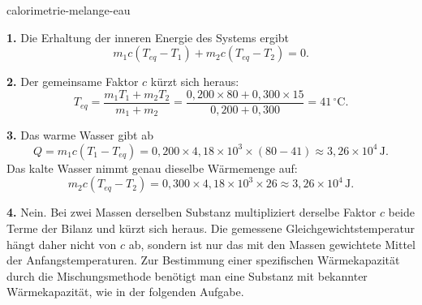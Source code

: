 \begin{exo}{calorimetrie-melange-eau}
\begin{solution}
\textbf{1.} Die Erhaltung der inneren Energie des Systems ergibt
\[
m_1c(T_{eq}-T_1)+m_2c(T_{eq}-T_2)=0.
\]

\textbf{2.} Der gemeinsame Faktor $c$ kürzt sich heraus:
\[
T_{eq}=\frac{m_1T_1+m_2T_2}{m_1+m_2}
=\frac{0{,}200\times80+0{,}300\times15}{0{,}200+0{,}300}
=41\,^\circ\text{C}.
\]

\textbf{3.} Das warme Wasser gibt ab
\[
Q=m_1c(T_1-T_{eq})
=0{,}200\times4{,}18\times10^3\times(80-41)
\approx3{,}26\times10^4\,\text{J}.
\]
Das kalte Wasser nimmt genau dieselbe Wärmemenge auf:
\[
m_2c(T_{eq}-T_2)
=0{,}300\times4{,}18\times10^3\times26
\approx3{,}26\times10^4\,\text{J}.
\]

\textbf{4.} Nein. Bei zwei Massen derselben Substanz multipliziert derselbe Faktor $c$ beide Terme der Bilanz und kürzt sich heraus. Die gemessene Gleichgewichtstemperatur hängt daher nicht von $c$ ab, sondern ist nur das mit den Massen gewichtete Mittel der Anfangstemperaturen. Zur Bestimmung einer spezifischen Wärmekapazität durch die Mischungsmethode benötigt man eine Substanz mit bekannter Wärmekapazität, wie in der folgenden Aufgabe.
\end{solution}
\end{exo}

